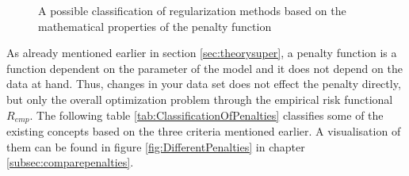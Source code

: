 \documentclass[12pt,a4paper]{article}
\begin{document}
\begin{figure}
\begin{center}
\end{center}
\caption{A possible classification of regularization methods based on the mathematical properties of the penalty function} \label{fig:Classification}
\end{figure}
As already mentioned earlier in section \ref{sec:theorysuper}, a penalty function is a function dependent on the parameter of the model and it does not depend on the data at hand. Thus, changes in your data set does not effect the penalty directly, but only the overall optimization problem through the empirical risk functional $R_{emp}$. The following table \ref{tab:ClassificationOfPenalties} classifies some of the existing concepts based on the three criteria mentioned earlier. A visualisation of them can be found in figure \ref{fig:DifferentPenalties} in chapter \ref{subsec:comparepenalties}.\\
\end{document}
